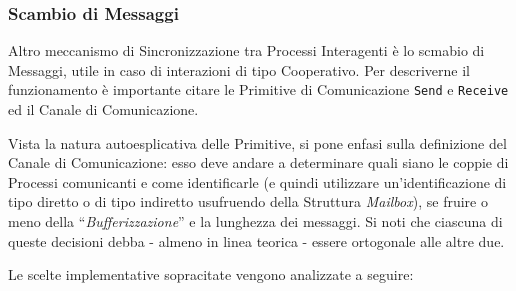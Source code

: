 \subsubsection{Scambio di Messaggi}
Altro meccanismo di Sincronizzazione tra Processi Interagenti è lo scmabio di Messaggi\cite{Messaggi}, utile in caso di interazioni di tipo Cooperativo. Per descriverne il funzionamento è importante citare le Primitive di Comunicazione \texttt{Send} e \texttt{Receive} ed il Canale di Comunicazione. \par
Vista la natura autoesplicativa delle Primitive, si pone enfasi sulla definizione del Canale di Comunicazione: esso deve andare a determinare quali siano le coppie di Processi comunicanti e come identificarle (e quindi utilizzare un'identificazione di tipo diretto o di tipo indiretto usufruendo della Struttura \textit{Mailbox}), se fruire o meno della ``\textit{Bufferizzazione}'' e la lunghezza dei messaggi. Si noti che ciascuna di queste decisioni debba - almeno in linea teorica - essere ortogonale alle altre due. \par
Le scelte implementative sopracitate vengono analizzate a seguire:
